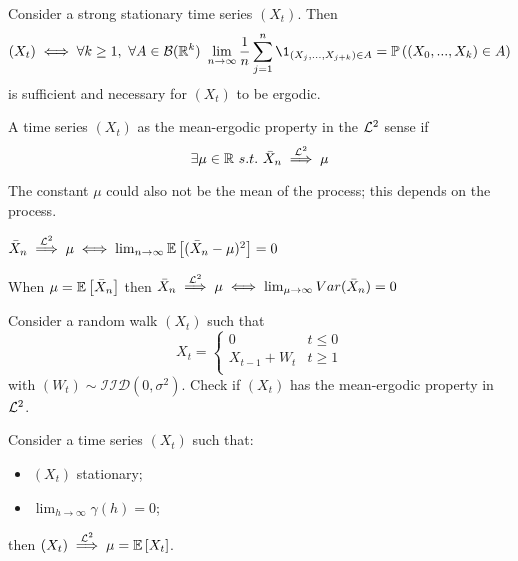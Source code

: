 \begin{theorem}
    Consider a strong stationary time series $(X_t)$. Then
    \[
        (X_t)\iff\forall k\ge 1,\ \forall A\in\mathcal{B}(\R^k)\ \lim_{n\to\infty}\frac{1}{n}\sum_{j=1}^{n}\1_{(X_j,...,X_{j+k})\in A}=\prob{(X_0,...,X_k)\in A}
    \]
    is sufficient and necessary for $(X_t)$ to be ergodic.
\end{theorem}

\begin{definition}
    A time series $(X_t)$ as the mean-ergodic property in the $\mathcal{L}^{2}$ sense if 
    \[
        \exists\mu\in\R\ s.t.\ \mean{X}_n\stackrel{\el{2}}{\implies}\mu  
    \]
\end{definition}

\begin{remark}
    The constant $\mu$ could also not be the mean of the process; this depends on the process.
\end{remark}

\begin{remark}
    $\bar{X}_n\stackrel{\mathcal{L}^{2}}{\implies}\mu\iff\lim_{n\to\infty}\mathbb{E}\left[(\bar{X}_n-\mu)^2\right]=0$
\end{remark}

\begin{remark}
    When $\mu=\mathbb{E}\left[\bar{X}_n\right]$ then $\bar{X}_n\stackrel{\mathcal{L}^{2}}{\implies}\mu\iff\lim_{\mu\to\infty}Var(\bar{X}_n)=0$
\end{remark}

\begin{exercise}
    Consider a random walk $(X_t)$ such that
    \begin{equation*}
        X_t=\begin{cases}
            0&t\le0\\
            X_{t-1}+W_t&t\ge1\\
        \end{cases}
    \end{equation*}
    with $(W_t)\sim\mathcal{IID}(0,\sigma^2)$. Check if $(X_t)$ has the mean-ergodic property in $\mathcal{L}^{2}$.
\end{exercise}

\begin{theorem}
    Consider a time series $(X_t)$ such that:
    \begin{itemize}
        \item $(X_t)$ stationary;
        \item $\lim_{h\to\infty}\gamma(h)=0$;
    \end{itemize}
    then $(X_t)\stackrel{\mathcal{L}^{2}}{\implies}\mu=\mathbb{E}\left[X_t\right]$.
\end{theorem}

